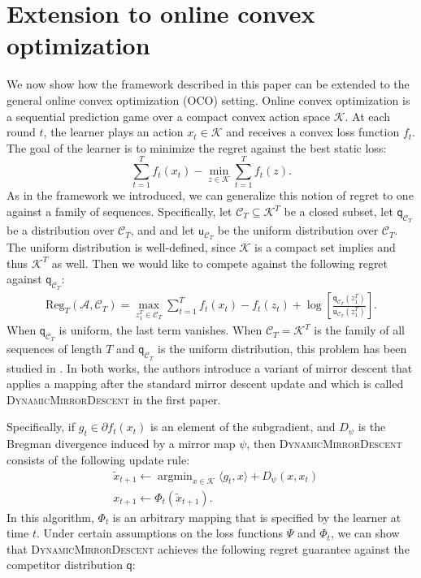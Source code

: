 \documentclass{article}
\DeclareMathOperator*{\argmin}{argmin}
\newcommand{\sC}{\mathscr C}
\newcommand{\sfq}{{\mathsf q}}
\newcommand{\sfu}{{\mathsf u}}
\newcommand{\cA}{\mathcal A}
\newcommand{\cC}{\mathcal C}
\newcommand{\cK}{\mathcal K}
\newcommand{\Reg}{\mathrm{Reg}}
\begin{document}
\newpage
\section{Extension to online convex optimization}
\label{app:oco}

We now show how the framework described in this paper can be extended
to the general online convex optimization (OCO) setting.  Online
convex optimization is a sequential prediction game over a compact
convex action space $\cK$. At each round $t$, the learner plays an
action $x_t \in \cK$ and receives a convex loss function $f_t$. The
goal of the learner is to minimize the regret against the best static
loss:
\begin{equation*}
\sum_{t = 1}^T f_t(x_t) - \min_{z \in \cK} \sum_{t = 1}^T f_t(z).
\end{equation*}
As in the framework we introduced, we can generalize
this notion of regret to one against a family of sequences. 
Specifically, let $\cC_T \subseteq \cK^T$ be a closed subset, let 
$\sfq_{\cC_T}$ be a distribution over $\cC_T$, and 
and let $\sfu_{\cC_T}$ be the uniform distribution over $\cC_T$. The uniform distribution
is well-defined, since $\cK$ is a compact set implies and thus $\cK^T$
as well. 
Then we would like to compete against the following regret against $\sfq_{\cC_T}$:
\begin{align}
  \label{eq:ocoregret}
  \Reg_T(\cA, \sC_T) = \max_{z_1^T \in \cC_T} \sum_{t = 1}^T f_t(x_t) - f_t(z_t) + \log\left[\frac{\sfq_{\cC_T}(z_1^T)}{\sfu_{\cC_T}(z_1^T)}\right].
\end{align}
When $\sfq_{\cC_T}$ is uniform, the last term vanishes.  When
$\cC_T = \cK^T$ is the family of all sequences of length $T$ and
$\sfq_{\cC_T}$ is the uniform distribution, this problem has been
studied in \citep{HallWillett2013, GyorgySzepesvari2016}.  In both
works, the authors introduce a variant of mirror descent that applies
a mapping after the standard mirror descent update and which is called
\textsc{DynamicMirrorDescent} in the first paper.

Specifically, if $g_t \in \partial f_t(x_t)$ is an element of the subgradient,
and $D_\psi$ is the Bregman divergence induced by a mirror map $\psi$,
then \textsc{DynamicMirrorDescent} consists of the following update rule:
\begin{align*}
  &\tilde{x}_{t+1} \gets \argmin_{x \in \cK} \langle g_t, x\rangle + D_\psi(x, x_t) \\
  &x_{t+1} \gets \Phi_t(\tilde{x}_{t+1}).
\end{align*}
In this algorithm, $\Phi_t$ is an arbitrary mapping that is specified
by the learner at time $t$.  Under certain assumptions on the loss
functions $\Psi$ and $\Phi_t$, we can show that \textsc{DynamicMirrorDescent} achieves
the following regret guarantee against the competitor distribution
$\sfq$:
\end{document}
